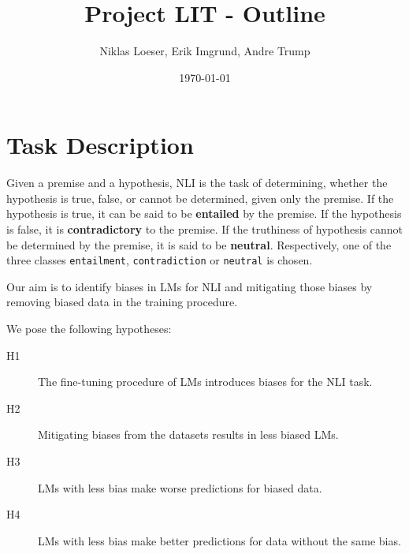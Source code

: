 \documentclass[12pt,a4paper]{article}
\title{Project LIT - Outline}
\author{Niklas Loeser, Erik Imgrund, Andre Trump}
\date{\today}
\begin{document}
\begin{acronym}
\end{acronym}

\maketitle

\section{Task Description}
Given a premise and a hypothesis, \ac{NLI} is the task of determining, whether the hypothesis is true, false, or cannot be determined, given only the premise. If the hypothesis is true, it can be said to be \textbf{entailed} by the premise. If the hypothesis is false, it is \textbf{contradictory} to the premise. If the truthiness of hypothesis cannot be determined by the premise, it is said to be \textbf{neutral}. Respectively, one of the three classes \texttt{entailment}, \texttt{contradiction} or \texttt{neutral} is chosen.

Our aim is to identify biases in \acp{LM} for \ac{NLI} and mitigating those biases by removing biased data in the training procedure.

We pose the following hypotheses:\vspace{-1.5em}
\begin{description}
  \item[H1] The fine-tuning procedure of \acp{LM} introduces biases for the \ac{NLI} task.\vspace{-0.7em}
  \item[H2] Mitigating biases from the datasets results in less biased \acp{LM}.\vspace{-0.7em}
  \item[H3] \acp{LM} with less bias make worse predictions for biased data. \vspace{-0.7em}%
  \item[H4] \acp{LM} with less bias make better predictions for data without the same bias.
\end{description}
\end{document}
